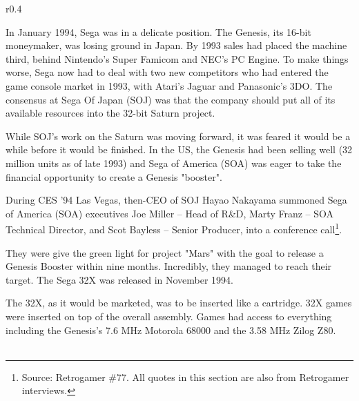 \begin{wrapfigure}[4]{r}{0.4\textwidth}{
\centering {}}
\end{wrapfigure}
In January 1994, Sega was in a delicate position. The Genesis, its 16-bit moneymaker, was losing ground in Japan. By 1993 sales had placed the machine third, behind Nintendo's Super Famicom and NEC's PC Engine. To make things worse, Sega now had to deal with two new competitors who had entered the game console market in 1993, with Atari's Jaguar and Panasonic's 3DO. The consensus at Sega Of Japan (SOJ) was that the company should put all of its available resources into the 32-bit Saturn project.\\
\par
While SOJ's work on the Saturn was moving forward, it was feared it would be a while before it would be finished. In the US, the Genesis had been selling well (32 million units as of late 1993) and Sega of America (SOA) was eager to take the financial opportunity to create a Genesis "booster".\\
\par
During CES '94 Las Vegas, then-CEO of SOJ Hayao Nakayama summoned Sega of America (SOA) executives Joe Miller -- Head of R\&D, Marty Franz -- SOA Technical Director, and Scot Bayless -- Senior Producer, into a conference call\footnote{Source: Retrogamer \#77. All quotes in this section are also from Retrogamer interviews.}.\\
\par 
They were give the green light for project "Mars" with the goal to release a Genesis Booster within nine months. Incredibly, they managed to reach their target. The Sega 32X was released in November 1994.\\
\par
{}%
\par
The 32X, as it would be marketed, was to be inserted like a cartridge. 32X games were inserted on top of the overall assembly. Games had access to everything including the Genesis's 7.6 MHz Motorola 68000 and the 3.58 MHz Zilog Z80.\\

\\
\par

